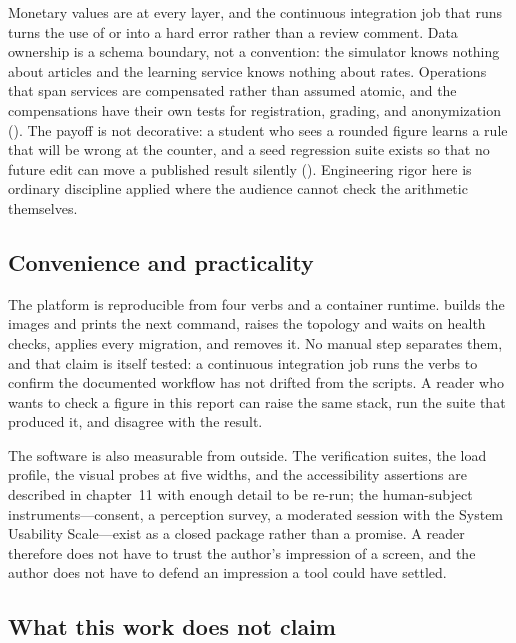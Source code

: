 Monetary values are  at every layer, and the continuous
integration job that runs  turns the use of  or
 into a hard error rather than a review comment. Data ownership is a
schema boundary, not a convention: the simulator knows nothing about articles and
the learning service knows nothing about rates. Operations
that span services are compensated rather than assumed atomic, and the
compensations have their own tests for registration, grading, and anonymization
(). The payoff is not decorative: a
student who sees a rounded figure learns a rule that will be wrong at the
counter, and a seed regression suite exists so that no future edit can move a
published result silently ().
Engineering rigor here is ordinary discipline applied where the audience cannot
check the arithmetic themselves.

\subsection{Convenience and practicality}

The platform is reproducible from four verbs and a container runtime.
 builds the images and prints the next command, 
raises the topology and waits on health checks,  applies every
migration, and  removes it. No manual step separates them, and
that claim is itself tested: a continuous integration job runs the verbs to
confirm the documented workflow has not drifted from the scripts. A reader who
wants to check a figure in this report can raise the same stack, run the suite
that produced it, and disagree with the result.

The software is also measurable from outside. The verification suites, the load
profile, the visual probes at five widths, and the accessibility assertions are
described in chapter~11 with enough detail to be re-run; the human-subject
instruments---consent, a perception survey, a moderated session with the System
Usability Scale---exist as a closed package rather than a promise. A reader
therefore does not have to trust the author's impression of a screen, and the
author does not have to defend an impression a tool could have settled.

\subsection{What this work does not claim}

